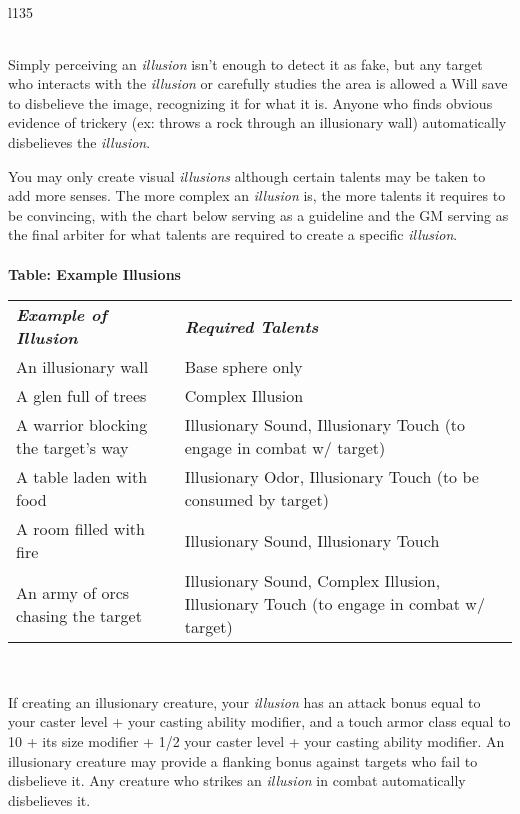 {\begin{wraptable}[11]{l}{135\unitlength}
\begin{tabular}{c>{\centering}p{45\unitlength}>{\centering}p{30\unitlength}}
		\end{tabular}
	\end{wraptable}
	\par Simply perceiving an \textit{illusion} isn't enough to detect it as fake, but any target who interacts with the \textit{illusion} or carefully studies the area is allowed a Will save to disbelieve the image, recognizing it for what it is. Anyone who finds obvious evidence of trickery (ex: throws a rock through an illusionary wall) automatically disbelieves the \textit{illusion}.
	\par You may only create visual \textit{illusions} although certain talents may be taken to add more senses. The more complex an \textit{illusion} is, the more talents it requires to be convincing, with the chart below serving as a guideline and the GM serving as the final arbiter for what talents are required to create a specific \textit{illusion}.\\\\
	\small\textbf{Table: Example Illusions}\\
	\begin{tabular}{>{\centering}p{85\unitlength}>{\centering}p{110\unitlength}}
		\rowcolor{gray!50}
		\textbf{\textit{Example of Illusion}} &\textbf{\textit{Required Talents}}\tabularnewline
		An illusionary wall & Base sphere only \tabularnewline
		A glen full of trees & Complex Illusion \tabularnewline
		A warrior blocking the target's way & Illusionary Sound, Illusionary Touch (to engage in combat w/ target) \tabularnewline
		A table laden with food & Illusionary Odor, Illusionary Touch (to be consumed by target)\tabularnewline
		A room filled with fire & Illusionary Sound, Illusionary Touch\tabularnewline
		An army of orcs chasing the target& Illusionary Sound, Complex Illusion, Illusionary Touch (to engage in combat w/ target)
	\end{tabular}\\
	\par If creating an illusionary creature, your \textit{illusion} has an attack bonus equal to your caster level + your casting ability modifier, and a touch armor class equal to 10 + its size modifier + 1/2 your caster level + your casting ability modifier. An illusionary creature may provide a flanking bonus against targets who fail to disbelieve it. Any creature who strikes an \textit{illusion} in combat automatically disbelieves it.}
